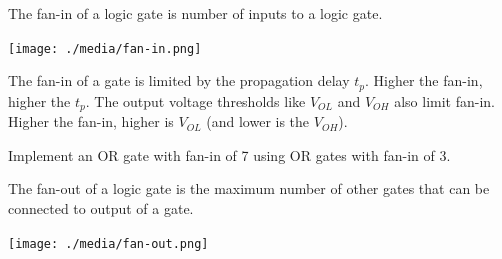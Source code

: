 
% 
% 
% 
% 


\begin{definition}[Fan-in]
  The fan-in of a logic gate is number of  inputs to a logic gate.~\cite[Section~B.8.9]{stephen2022fundamentals}
\end{definition}
\texttt{[image: ./media/fan-in.png]}

\begin{remark}[Fan-in]
  The fan-in of a gate is limited by the propagation delay $t_p$. Higher the
  fan-in, higher the $t_p$. The output
  voltage thresholds like $V_{OL}$ and $V_{OH}$ also limit fan-in. Higher the
  fan-in, higher is $V_{OL}$ (and lower is the $V_{OH}$).
\end{remark}

\begin{example}
  Implement an OR gate with fan-in of 7 using OR gates with fan-in of 3.
\end{example}
\vspace{5em}

\begin{definition}
  The fan-out of a logic gate is the maximum number of other gates that can be connected
  to output of a gate.~\cite[Section~B.8.9]{stephen2022fundamentals}
\end{definition}
\texttt{[image: ./media/fan-out.png]}


